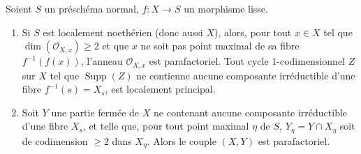 \begin{proposition}[21.14.3]
\label{IV.21.14.3}
Soient $S$ un préschéma normal, $f:X\to S$ un morphisme lisse.
\begin{enumerate}[label=(\roman*)]
  \item Si $S$ est localement noethérien (donc aussi $X$), alors, pour tout $x\in X$
  tel que $\dim(\mathcal O_{X,x})\geq2$ et que $x$ ne soit pas point maximal de sa
  fibre $f^{-1}(f(x))$, l'anneau $\mathcal O_{X,x}$ est parafactoriel. Tout cycle
  $1$-codimensionnel $Z$ sur $X$ tel que $\operatorname{Supp}(Z)$ ne contienne aucune
  composante irréductible d'une fibre $f^{-1}(s)=X_s$, est localement principal.
  \item Soit $Y$ une partie fermée de $X$ ne contenant aucune composante irréductible
  d'une fibre $X_s$, et telle que, pour tout point maximal $\eta$ de $S$,
  $Y_\eta=Y\cap X_\eta$ soit de codimension $\geq2$ dans $X_\eta$. Alors le couple
  $(X,Y)$ est parafactoriel.
\end{enumerate}
\end{proposition}

